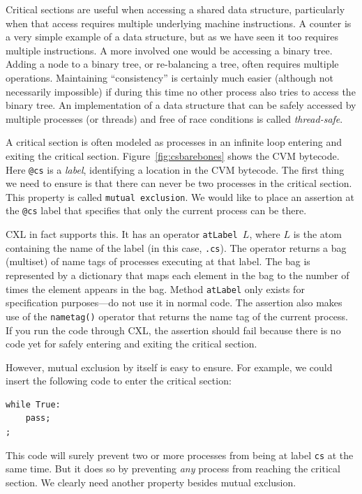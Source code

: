 \documentclass{report}
\newenvironment{code}{
\tcolorbox
}{
\endtcolorbox
}
\begin{document}

Critical sections are useful when accessing a shared data
structure, particularly when that access requires multiple underlying
machine instructions.  A counter is a very simple example of
a data structure, but as we have seen it too requires multiple instructions.
A more involved one would be accessing a binary tree.
Adding a node to a binary tree, or re-balancing a tree, often requires
multiple operations.  Maintaining ``consistency'' is certainly much easier
(although not necessarily impossible) if during this time no other
process also tries to access the binary tree.
An implementation of a data structure that can be safely accessed by multiple
processes (or threads) and free of race conditions is called \emph{thread-safe}.


A critical section is often modeled as processes in an infinite loop
entering and exiting the critical section.
Figure~\ref{fig:csbarebones} shows the CVM bytecode.
Here \texttt{@cs} is a \emph{label},
identifying a location in the CVM bytecode.  The first thing we need to
ensure is that there can never be two processes in the critical section.
This property is called \texttt{mutual exclusion}.
We would like to place an assertion at the \texttt{@cs} label that
specifies that only the current process can be there.

CXL in fact supports this.
It has an operator \texttt{atLabel $L$},
where $L$
is the atom containing the name of the label (in this case, \texttt{.cs}).
The operator returns a bag (multiset) of name tags of processes executing at that
label.  The bag is represented by a dictionary that maps each element
in the bag to the number of times the element appears in the bag.
Method \texttt{atLabel} only exists for specification purposes---do not
use it in normal code.
The assertion also makes use of the \texttt{nametag()} operator
that returns the name tag of the current process.
If you run the code through CXL, the assertion should fail because
there is no code yet for safely entering and exiting the critical section.

However, mutual exclusion by itself is easy to ensure.
For example, we could insert the following code to enter the
critical section:
\begin{code}
\begin{verbatim}
while True:
    pass;
;
\end{verbatim}
\end{code}
This code will surely prevent two or more processes from being
at label \texttt{cs} at the same time.
But it does so by preventing \emph{any} process from reaching
the critical section.
We clearly need another property besides mutual exclusion.
\end{document}
